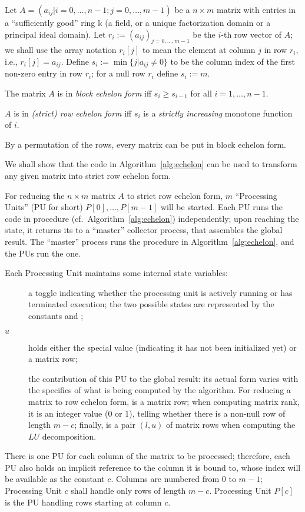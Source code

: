 Let $A = (a_{ij} | i = 0, \ldots, n-1; j = 0, \ldots, m-1)$ be a $n
\times m$ matrix with entries in a ``sufficiently good'' ring
$\mathbb{k}$ (a field, or a unique factorization domain or a principal
ideal domain).  Let $r_i := (a_{ij})_{j = 0, \ldots, m-1}$ be the
$i$-th row vector of $A$; we shall use the array notation $r_i[j]$ to
mean the element at column $j$ in row $r_i$, i.e., $r_i[j] = a_{ij}$.
Define $s_i := \min \{j | a_{ij} \not= 0 \}$ to be the column index of
the first non-zero entry in row $r_i$; for a null row $r_i$ define
$s_i := m$.
\begin{definition}
  The matrix $A$ is in \emph{block echelon form} iff $s_i
  \geq s_{i-1}$ for all $i = 1, \ldots, n-1$.

  $A$ is in \emph{(strict) row echelon form} iff $s_i$ is a
  \emph{strictly increasing} monotone function of $i$.
\end{definition}
By a permutation of the rows, every matrix can be put in block
echelon form.  

We shall show that the code in Algorithm~\ref{alg:echelon} can be used
to transform any given matrix into strict row echelon form.

For reducing the $n\times m$ matrix $A$ to strict row echelon form,
$m$ ``Processing Units'' (PU for short) $P[0], \ldots, P[m-1]$ will
be started.  Each PU runs the code in procedure 
(cf.~Algorithm~\ref{alg:echelon}) independently; upon reaching the
 state, it returns its  to a ``master''
collector process, that assembles the global result.  The ``master''
process runs the  procedure in
Algorithm~\ref{alg:echelon}, and the PUs run the 
one.

Each Processing Unit maintains some internal state variables:
\begin{description}
\item[] a toggle indicating whether the processing unit is
  actively running or has terminated execution; the two possible states
  are represented by the constants  and ;
\item[$u$] holds either the special value  (indicating it has
  not been initialized yet) or a matrix row;
\item[] the contribution of this PU to the global result:
  its actual form varies with the specifics of what is being computed
  by the algorithm.  For reducing a matrix to row echelon form,
   is a matrix row; when computing matrix rank, it is an
  integer value (0 or 1), telling whether there is a non-null row of
  length $m-c$; finally,  is a pair $(l, u)$ of matrix rows
  when computing the $LU$ decomposition.
\end{description}
There is one PU for each column of the matrix to be processed;
therefore, each PU also holds an implicit reference to the column it
is bound to, whose index will be available as the constant $c$.
Columns are numbered from 0 to $m-1$; Processing Unit $c$ shall handle
only rows of length $m - c$.  Processing Unit $P[c]$ is the PU
handling rows starting at column $c$.

